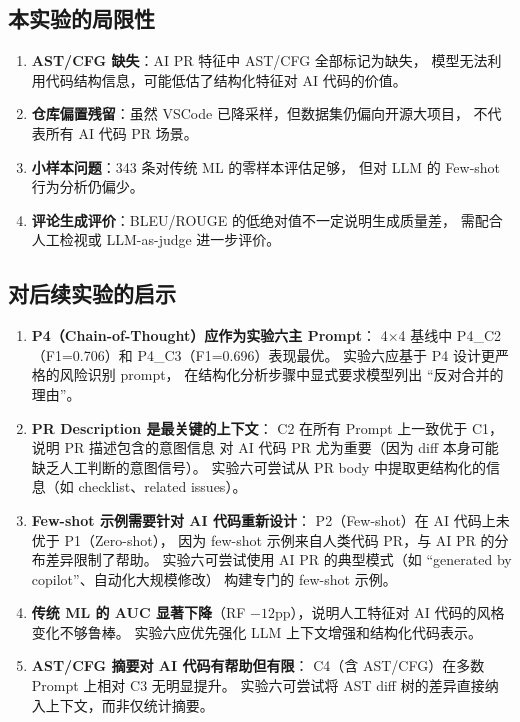 \documentclass{experimentreport}
\begin{document}
\subsection{本实验的局限性}

\begin{enumerate}
    \item \textbf{AST/CFG 缺失}：AI PR 特征中 AST/CFG 全部标记为缺失，
          模型无法利用代码结构信息，可能低估了结构化特征对 AI 代码的价值。
    \item \textbf{仓库偏置残留}：虽然 VSCode 已降采样，但数据集仍偏向开源大项目，
          不代表所有 AI 代码 PR 场景。
    \item \textbf{小样本问题}：343 条对传统 ML 的零样本评估足够，
          但对 LLM 的 Few-shot 行为分析仍偏少。
    \item \textbf{评论生成评价}：BLEU/ROUGE 的低绝对值不一定说明生成质量差，
          需配合人工检视或 LLM-as-judge 进一步评价。
\end{enumerate}

\subsection{对后续实验的启示}

\begin{enumerate}
    \item \textbf{P4（Chain-of-Thought）应作为实验六主 Prompt}：
          4×4 基线中 P4\_C2（F1=0.706）和 P4\_C3（F1=0.696）表现最优。
          实验六应基于 P4 设计更严格的风险识别 prompt，
          在结构化分析步骤中显式要求模型列出 ``反对合并的理由''。

    \item \textbf{PR Description 是最关键的上下文}：
          C2 在所有 Prompt 上一致优于 C1，说明 PR 描述包含的意图信息
          对 AI 代码 PR 尤为重要（因为 diff 本身可能缺乏人工判断的意图信号）。
          实验六可尝试从 PR body 中提取更结构化的信息（如 checklist、related issues）。

    \item \textbf{Few-shot 示例需要针对 AI 代码重新设计}：
          P2（Few-shot）在 AI 代码上未优于 P1（Zero-shot），
          因为 few-shot 示例来自人类代码 PR，与 AI PR 的分布差异限制了帮助。
          实验六可尝试使用 AI PR 的典型模式（如 ``generated by copilot''、自动化大规模修改）
          构建专门的 few-shot 示例。

    \item \textbf{传统 ML 的 AUC 显著下降}（RF $-12$pp），说明人工特征对 AI 代码的风格变化不够鲁棒。
          实验六应优先强化 LLM 上下文增强和结构化代码表示。

    \item \textbf{AST/CFG 摘要对 AI 代码有帮助但有限}：
          C4（含 AST/CFG）在多数 Prompt 上相对 C3 无明显提升。
          实验六可尝试将 AST diff 树的差异直接纳入上下文，而非仅统计摘要。
\end{enumerate}
\end{document}

